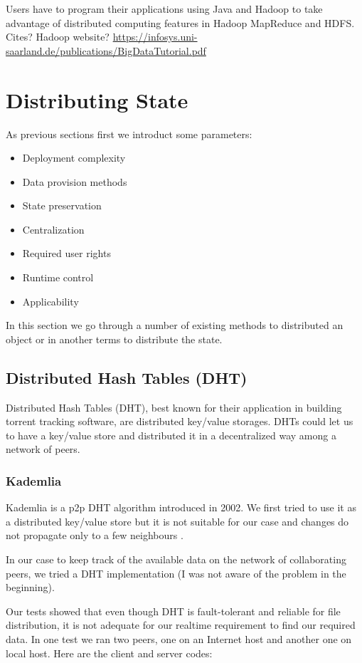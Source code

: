 Users have to program their applications using Java and Hadoop to 
take advantage of distributed computing features in Hadoop MapReduce
and HDFS. Cites? Hadoop website?
\url{https://infosys.uni-saarland.de/publications/BigDataTutorial.pdf}

\section{Distributing State}
As previous sections first we introduct some parameters:
\begin{itemize}
\item Deployment complexity
\item Data provision methods
\item State preservation
\item Centralization
\item Required user rights
\item Runtime control
\item Applicability
\end{itemize}
In this section we go through a number of existing methods to distributed an object or in another terms to distribute the state.

\subsection{Distributed Hash Tables (DHT)}
Distributed Hash Tables (DHT), best known for their application in building torrent tracking software,
are distributed key/value storages. DHTs could let us to have a key/value store and distributed it in 
a decentralized way among a network of peers.

\subsubsection{Kademlia}
Kademlia is a p2p DHT algorithm introduced in 2002. We first tried to use it as a distributed key/value store but 
it is not suitable for our case and changes do not propagate only to a few neighbours \cite{KademliaPaper}.

In our case to keep track of the available data on the network of collaborating peers, we tried a DHT implementation 
(I was not aware of the problem in the beginning).

Our tests showed that even though DHT is fault-tolerant and reliable for file distribution,
it is not adequate for our realtime requirement to find our required data. In one test we ran two peers,
one on an Internet host and another one on local host. Here are the client and server codes:

